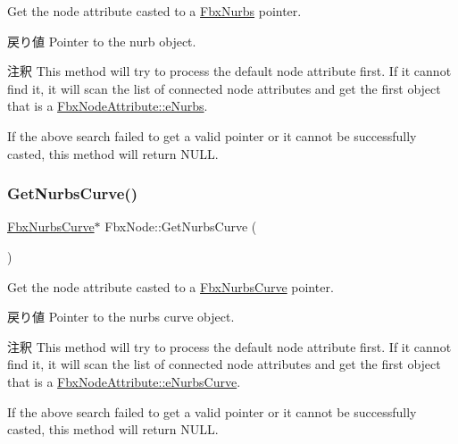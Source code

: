 Get the node attribute casted to a \hyperlink{class_fbx_nurbs}{Fbx\+Nurbs} pointer. \begin{DoxyReturn}{戻り値}
Pointer to the nurb object. 
\end{DoxyReturn}
\begin{DoxyRemark}{注釈}
This method will try to process the default node attribute first. If it cannot find it, it will scan the list of connected node attributes and get the first object that is a \hyperlink{class_fbx_node_attribute_a08e1669d3d1a696910756ab17de56d6aa34e416198478e89143c5d2eaf909cecc}{Fbx\+Node\+Attribute\+::e\+Nurbs}. 

If the above search failed to get a valid pointer or it cannot be successfully casted, this method will return {\ttfamily N\+U\+LL}. 
\end{DoxyRemark}
\mbox{\label{class_fbx_node_a5a57feb5e988b184bef84058f53e3184}} 
\subsubsection{\texorpdfstring{Get\+Nurbs\+Curve()}{GetNurbsCurve()}}
{\footnotesize\ttfamily \hyperlink{class_fbx_nurbs_curve}{Fbx\+Nurbs\+Curve}$\ast$ Fbx\+Node\+::\+Get\+Nurbs\+Curve (\begin{DoxyParamCaption}{ }\end{DoxyParamCaption})}

Get the node attribute casted to a \hyperlink{class_fbx_nurbs_curve}{Fbx\+Nurbs\+Curve} pointer. \begin{DoxyReturn}{戻り値}
Pointer to the nurbs curve object. 
\end{DoxyReturn}
\begin{DoxyRemark}{注釈}
This method will try to process the default node attribute first. If it cannot find it, it will scan the list of connected node attributes and get the first object that is a \hyperlink{class_fbx_node_attribute_a08e1669d3d1a696910756ab17de56d6aae7a889cc6d7682817fc718d13048187f}{Fbx\+Node\+Attribute\+::e\+Nurbs\+Curve}. 

If the above search failed to get a valid pointer or it cannot be successfully casted, this method will return {\ttfamily N\+U\+LL}. 
\end{DoxyRemark}
\mbox{\label{class_fbx_node_abddb891023f93474f91e443f2c523d5f}} 
